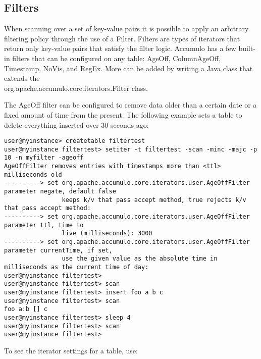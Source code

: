 \subsection{Filters}
When scanning over a set of key-value pairs it is possible to apply an arbitrary
filtering policy through the use of a Filter. Filters are types of iterators that return
only key-value pairs that satisfy the filter logic. Accumulo has a few built-in filters
that can be configured on any table: AgeOff, ColumnAgeOff, Timestamp, NoVis, and RegEx. More can be added
by writing a Java class that extends the\\
org.apache.accumulo.core.iterators.Filter class.

The AgeOff filter can be configured to remove data older than a certain date or a fixed
amount of time from the present. The following example sets a table to delete
everything inserted over 30 seconds ago:

\begingroup\fontsize{8pt}{8pt}\selectfont\begin{verbatim}
user@myinstance> createtable filtertest
user@myinstance filtertest> setiter -t filtertest -scan -minc -majc -p 10 -n myfilter -ageoff
AgeOffFilter removes entries with timestamps more than <ttl> milliseconds old
----------> set org.apache.accumulo.core.iterators.user.AgeOffFilter parameter negate, default false
                keeps k/v that pass accept method, true rejects k/v that pass accept method: 
----------> set org.apache.accumulo.core.iterators.user.AgeOffFilter parameter ttl, time to
                live (milliseconds): 3000
----------> set org.apache.accumulo.core.iterators.user.AgeOffFilter parameter currentTime, if set,
                use the given value as the absolute time in milliseconds as the current time of day: 
user@myinstance filtertest> 
user@myinstance filtertest> scan
user@myinstance filtertest> insert foo a b c
user@myinstance filtertest> scan
foo a:b [] c
user@myinstance filtertest> sleep 4
user@myinstance filtertest> scan
user@myinstance filtertest>
\end{verbatim}\endgroup

To see the iterator settings for a table, use:

